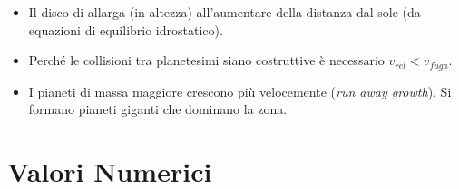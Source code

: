 \documentclass[11pt,a4paper]{article}
\begin{document}
\begin{itemize}
\item Il disco di allarga (in altezza) all'aumentare della distanza dal sole (da equazioni di equilibrio idrostatico).

\item Perché le collisioni tra planetesimi siano costruttive è necessario $v_{rel} < v_{fuga}$.

\item I pianeti di massa maggiore crescono più velocemente (\textit{run away growth}). Si formano pianeti giganti che dominano la zona.
\end{itemize}

\section{Valori Numerici}
\end{document}
